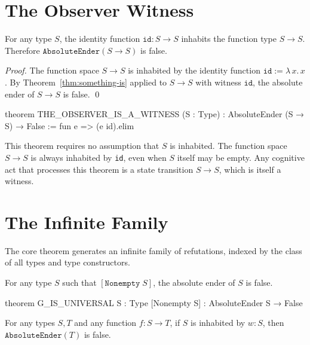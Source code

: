 \section{The Observer Witness}

\begin{theorem}\label{thm:observer}
For any type $S$, the identity function $\texttt{id} : S \to S$ inhabits the function type $S \to S$. Therefore $\texttt{AbsoluteEnder}(S \to S)$ is false.
\end{theorem}

\begin{proof}
The function space $S \to S$ is inhabited by the identity function $\texttt{id} := \lambda\, x.\, x$. By Theorem~\ref{thm:something-is} applied to $S \to S$ with witness $\texttt{id}$, the absolute ender of $S \to S$ is false. \qed
\end{proof}

\begin{leancode}
theorem THE_OBSERVER_IS_A_WITNESS (S : Type) :
    AbsoluteEnder (S → S) → False :=
    fun e => (e id).elim
\end{leancode}

\begin{remark}
This theorem requires no assumption that $S$ is inhabited. The function space $S \to S$ is always inhabited by \texttt{id}, even when $S$ itself may be empty. Any cognitive act that processes this theorem is a state transition $S \to S$, which is itself a witness.
\end{remark}

\section{The Infinite Family}

The core theorem generates an infinite family of refutations, indexed by the class of all types and type constructors.

\begin{theorem}\label{thm:universal}
For any type $S$ such that $[\texttt{Nonempty}\; S]$, the absolute ender of $S$ is false.
\end{theorem}

\begin{leancode}
theorem G_IS_UNIVERSAL {S : Type} [Nonempty S] :
    AbsoluteEnder S → False
\end{leancode}

\begin{theorem}\label{thm:propagation}
For any types $S, T$ and any function $f : S \to T$, if $S$ is inhabited by $w : S$, then $\texttt{AbsoluteEnder}(T)$ is false.
\end{theorem}

